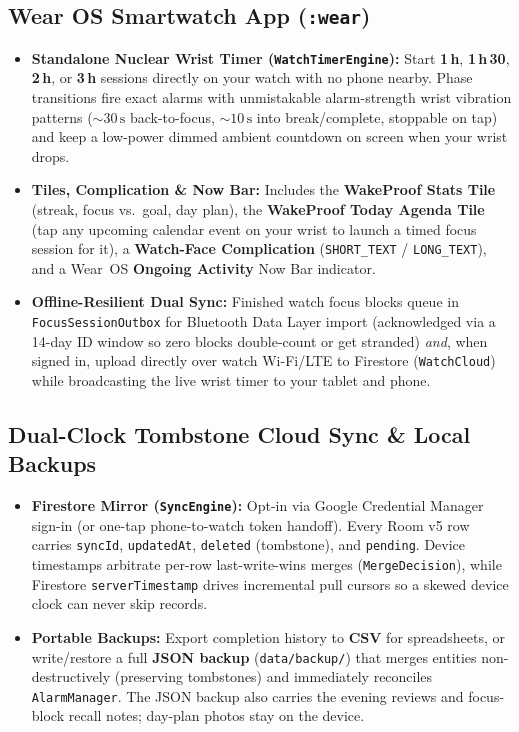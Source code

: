\documentclass[11pt,a4paper]{article}
\begin{document}
\subsection{Wear OS Smartwatch App (\texttt{:wear})}
\begin{itemize}
  \item \textbf{Standalone Nuclear Wrist Timer (\texttt{WatchTimerEngine}):} Start \textbf{1\,h}, \textbf{1\,h\,30}, \textbf{2\,h}, or \textbf{3\,h} sessions directly on your watch with no phone nearby. Phase transitions fire exact alarms with unmistakable alarm-strength wrist vibration patterns ($\sim 30\,\text{s}$ back-to-focus, $\sim 10\,\text{s}$ into break/complete, stoppable on tap) and keep a low-power dimmed ambient countdown on screen when your wrist drops.
  \item \textbf{Tiles, Complication \& Now Bar:} Includes the \textbf{WakeProof Stats Tile} (streak, focus vs.\ goal, day plan), the \textbf{WakeProof Today Agenda Tile} (tap any upcoming calendar event on your wrist to launch a timed focus session for it), a \textbf{Watch-Face Complication} (\texttt{SHORT\_TEXT} / \texttt{LONG\_TEXT}), and a Wear~OS \textbf{Ongoing Activity} Now Bar indicator.
  \item \textbf{Offline-Resilient Dual Sync:} Finished watch focus blocks queue in \texttt{FocusSessionOutbox} for Bluetooth Data Layer import (acknowledged via a 14-day ID window so zero blocks double-count or get stranded) \emph{and}, when signed in, upload directly over watch Wi-Fi/LTE to Firestore (\texttt{WatchCloud}) while broadcasting the live wrist timer to your tablet and phone.
\end{itemize}

\subsection{Dual-Clock Tombstone Cloud Sync \& Local Backups}
\begin{itemize}
  \item \textbf{Firestore Mirror (\texttt{SyncEngine}):} Opt-in via Google Credential Manager sign-in (or one-tap phone-to-watch token handoff). Every Room v5 row carries \texttt{syncId}, \texttt{updatedAt}, \texttt{deleted} (tombstone), and \texttt{pending}. Device timestamps arbitrate per-row last-write-wins merges (\texttt{MergeDecision}), while Firestore \texttt{serverTimestamp} drives incremental pull cursors so a skewed device clock can never skip records.
  \item \textbf{Portable Backups:} Export completion history to \textbf{CSV} for spreadsheets, or write/restore a full \textbf{JSON backup} (\texttt{data/backup/}) that merges entities non-destructively (preserving tombstones) and immediately reconciles \texttt{AlarmManager}. The JSON backup also carries the evening reviews and focus-block recall notes; day-plan photos stay on the device.
\end{itemize}
\end{document}
